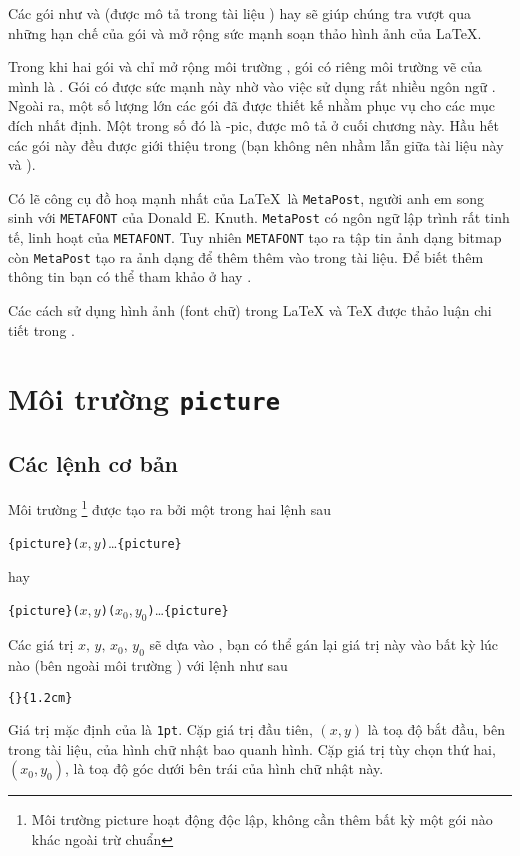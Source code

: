 Các gói như  và  (được mô tả trong tài liệu \companion) hay  sẽ giúp chúng tra vượt qua những hạn chế của gói  và mở rộng sức mạnh soạn thảo hình ảnh của \LaTeX.

Trong khi hai gói  và  chỉ mở rộng môi trường , gói  có riêng môi trường vẽ của mình là . Gói  có được sức mạnh này nhờ vào việc sử dụng rất nhiều ngôn ngữ \PSi{}. Ngoài ra, một số lượng lớn các gói đã được thiết kế nhằm phục vụ cho các mục đích nhất định. Một trong số đó là \texorpdfstring{\Xy}{Xy}-pic, được mô tả ở cuối chương này. Hầu hết các gói này đều được giới thiệu trong \graphicscompanion{} (bạn không nên nhầm lẫn giữa tài liệu này và \companion).

Có lẽ công cụ đồ hoạ mạnh nhất của \LaTeX\ là \texttt{MetaPost}, người anh em song sinh với \texttt{METAFONT} của Donald E. Knuth. \texttt{MetaPost} có ngôn ngữ lập trình rất tinh tế, linh hoạt của \texttt{METAFONT}. Tuy nhiên \texttt{METAFONT} tạo ra tập tin ảnh dạng bitmap còn \texttt{MetaPost} tạo ra ảnh dạng \PSi{} để thêm thêm vào trong tài liệu. Để biết thêm thông tin bạn có thể tham khảo ở \hobby hay \cite{ursowald}.

Các cách sử dụng hình ảnh (font chữ) trong \LaTeX{} và \TeX{} được thảo luận chi tiết trong \hoenig.

\section{Môi trường \texttt{picture}}

\subsection{Các lệnh cơ bản}

Môi trường \footnote{Môi trường picture hoạt động độc lập, không cần thêm bất kỳ một gói nào khác ngoài trừ \LaTeXe{} chuẩn} được tạo ra bởi một trong hai lệnh sau
\begin{lscommand}
\verb|{picture}(|$x,y$\verb|)|\ldots{}\verb|{picture}|
\end{lscommand}
\noindent hay
\begin{lscommand}
\verb|{picture}(|$x,y$\verb|)(|$x_0,y_0$\verb|)|\ldots{}\verb|{picture}|
\end{lscommand}
Các giá trị $x,\,y,\,x_0,\,y_0$ sẽ dựa vào , bạn có thể gán lại giá trị này vào bất kỳ lúc nào (bên ngoài môi trường ) với lệnh như sau
\begin{lscommand}
\verb|{|\verb|}{1.2cm}|
\end{lscommand}
Giá trị mặc định của  là \texttt{1pt}. Cặp giá trị đầu tiên, $(x,y)$ là toạ độ bắt đầu, bên trong tài liệu, của hình chữ nhật bao quanh hình. Cặp giá trị tùy chọn thứ hai, $(x_0, y_0)$, là toạ độ góc dưới bên trái của hình chữ nhật này.

